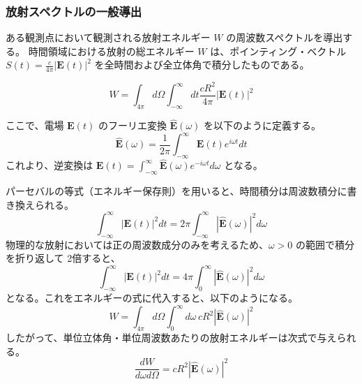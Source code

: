 \documentclass[a4paper,11pt]{bxjsarticle} %
\begin{document}


\subsubsection{放射スペクトルの一般導出}

ある観測点において観測される放射エネルギー $W$ の周波数スペクトルを導出する。
時間領域における放射の総エネルギー $W$ は、ポインティング・ベクトル $S(t) = \frac{c}{4\pi} |\bm{E}(t)|^2$ を全時間および全立体角で積分したものである。

\begin{equation}
    W = \int_{4\pi} d\Omega \int_{-\infty}^{\infty} dt \frac{c R^2}{4\pi} |\bm{E}(t)|^2
\end{equation}

ここで、電場 $\bm{E}(t)$ のフーリエ変換 $\hat{\bm{E}}(\omega)$ を以下のように定義する。
\begin{equation}
    \hat{\bm{E}}(\omega) = \frac{1}{2\pi} \int_{-\infty}^{\infty} \bm{E}(t) e^{i\omega t} dt
\end{equation}
これより、逆変換は $\bm{E}(t) = \int_{-\infty}^{\infty} \hat{\bm{E}}(\omega) e^{-i\omega t} d\omega$ となる。

パーセバルの等式（エネルギー保存則）を用いると、時間積分は周波数積分に書き換えられる。
\begin{equation}
    \int_{-\infty}^{\infty} |\bm{E}(t)|^2 dt = 2\pi \int_{-\infty}^{\infty} |\hat{\bm{E}}(\omega)|^2 d\omega
\end{equation}
物理的な放射においては正の周波数成分のみを考えるため、$\omega > 0$ の範囲で積分を折り返して 2倍すると、
\begin{equation}
    \int_{-\infty}^{\infty} |\bm{E}(t)|^2 dt = 4\pi \int_{0}^{\infty} |\hat{\bm{E}}(\omega)|^2 d\omega
\end{equation}
となる。これをエネルギーの式に代入すると、以下のようになる。
\begin{equation}
    W = \int_{4\pi} d\Omega \int_{0}^{\infty} d\omega \, c R^2 |\hat{\bm{E}}(\omega)|^2
\end{equation}
したがって、単位立体角・単位周波数あたりの放射エネルギーは次式で与えられる。
\begin{equation}
    \frac{dW}{d\omega d\Omega} = c R^2 |\hat{\bm{E}}(\omega)|^2
    \label{eq:spectral_energy_def}
\end{equation}
\end{document}
